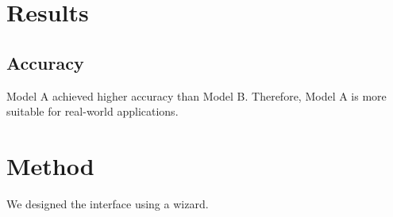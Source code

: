 \section{Results}
\subsection{Accuracy}
Model A achieved higher accuracy than Model B.
Therefore, Model A is more suitable for real-world applications.

\section{Method}
We designed the interface using a wizard.
